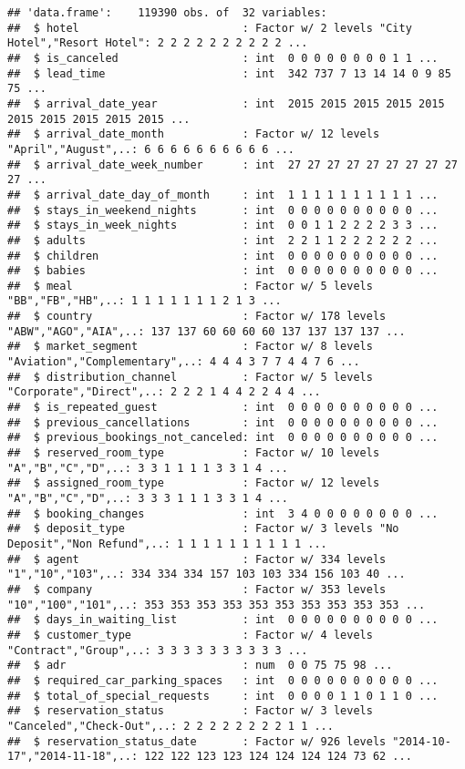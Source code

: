 \documentclass[]{article}
\begin{document}
\begin{verbatim}
## 'data.frame':    119390 obs. of  32 variables:
##  $ hotel                         : Factor w/ 2 levels "City Hotel","Resort Hotel": 2 2 2 2 2 2 2 2 2 2 ...
##  $ is_canceled                   : int  0 0 0 0 0 0 0 0 1 1 ...
##  $ lead_time                     : int  342 737 7 13 14 14 0 9 85 75 ...
##  $ arrival_date_year             : int  2015 2015 2015 2015 2015 2015 2015 2015 2015 2015 ...
##  $ arrival_date_month            : Factor w/ 12 levels "April","August",..: 6 6 6 6 6 6 6 6 6 6 ...
##  $ arrival_date_week_number      : int  27 27 27 27 27 27 27 27 27 27 ...
##  $ arrival_date_day_of_month     : int  1 1 1 1 1 1 1 1 1 1 ...
##  $ stays_in_weekend_nights       : int  0 0 0 0 0 0 0 0 0 0 ...
##  $ stays_in_week_nights          : int  0 0 1 1 2 2 2 2 3 3 ...
##  $ adults                        : int  2 2 1 1 2 2 2 2 2 2 ...
##  $ children                      : int  0 0 0 0 0 0 0 0 0 0 ...
##  $ babies                        : int  0 0 0 0 0 0 0 0 0 0 ...
##  $ meal                          : Factor w/ 5 levels "BB","FB","HB",..: 1 1 1 1 1 1 1 2 1 3 ...
##  $ country                       : Factor w/ 178 levels "ABW","AGO","AIA",..: 137 137 60 60 60 60 137 137 137 137 ...
##  $ market_segment                : Factor w/ 8 levels "Aviation","Complementary",..: 4 4 4 3 7 7 4 4 7 6 ...
##  $ distribution_channel          : Factor w/ 5 levels "Corporate","Direct",..: 2 2 2 1 4 4 2 2 4 4 ...
##  $ is_repeated_guest             : int  0 0 0 0 0 0 0 0 0 0 ...
##  $ previous_cancellations        : int  0 0 0 0 0 0 0 0 0 0 ...
##  $ previous_bookings_not_canceled: int  0 0 0 0 0 0 0 0 0 0 ...
##  $ reserved_room_type            : Factor w/ 10 levels "A","B","C","D",..: 3 3 1 1 1 1 3 3 1 4 ...
##  $ assigned_room_type            : Factor w/ 12 levels "A","B","C","D",..: 3 3 3 1 1 1 3 3 1 4 ...
##  $ booking_changes               : int  3 4 0 0 0 0 0 0 0 0 ...
##  $ deposit_type                  : Factor w/ 3 levels "No Deposit","Non Refund",..: 1 1 1 1 1 1 1 1 1 1 ...
##  $ agent                         : Factor w/ 334 levels "1","10","103",..: 334 334 334 157 103 103 334 156 103 40 ...
##  $ company                       : Factor w/ 353 levels "10","100","101",..: 353 353 353 353 353 353 353 353 353 353 ...
##  $ days_in_waiting_list          : int  0 0 0 0 0 0 0 0 0 0 ...
##  $ customer_type                 : Factor w/ 4 levels "Contract","Group",..: 3 3 3 3 3 3 3 3 3 3 ...
##  $ adr                           : num  0 0 75 75 98 ...
##  $ required_car_parking_spaces   : int  0 0 0 0 0 0 0 0 0 0 ...
##  $ total_of_special_requests     : int  0 0 0 0 1 1 0 1 1 0 ...
##  $ reservation_status            : Factor w/ 3 levels "Canceled","Check-Out",..: 2 2 2 2 2 2 2 2 1 1 ...
##  $ reservation_status_date       : Factor w/ 926 levels "2014-10-17","2014-11-18",..: 122 122 123 123 124 124 124 124 73 62 ...
\end{verbatim}
\end{document}
